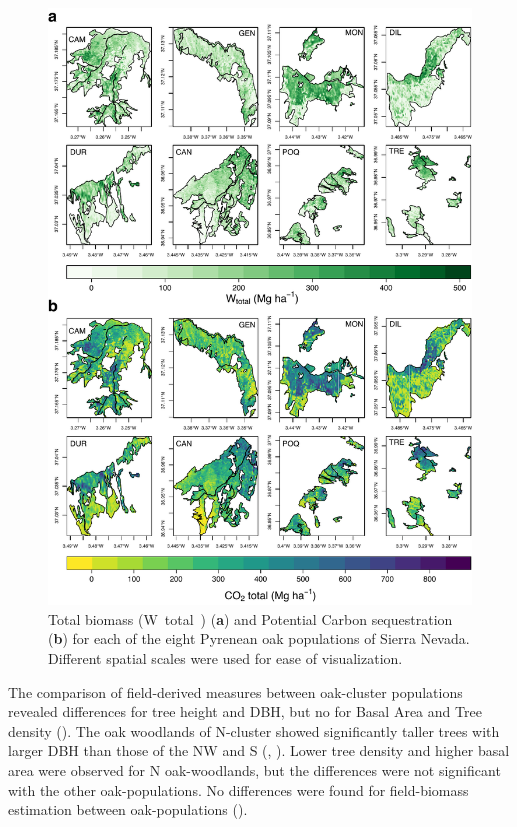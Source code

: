 \begin{figure}
    \centering
    \includegraphics[width=\textwidth]{img/carbon/carbon-mapas-wt-ct.pdf}
    \caption{Total biomass (W~total~) (\textbf{a}) and Potential Carbon sequestration (\textbf{b}) for each of the eight Pyrenean oak populations of Sierra Nevada. Different spatial scales were used for ease of visualization.}
    \label{fig:carbon:mapas-wt}
\end{figure}

The comparison of field-derived measures between oak-cluster populations revealed differences for tree height and DBH, but no for Basal Area and Tree density (). The oak woodlands of N-cluster showed significantly taller trees with larger DBH than those of the NW and S (, ). Lower tree density and higher basal area were observed for N oak-woodlands, but the differences were not significant with the other oak-populations. No differences were found for field-biomass estimation between oak-populations ().

